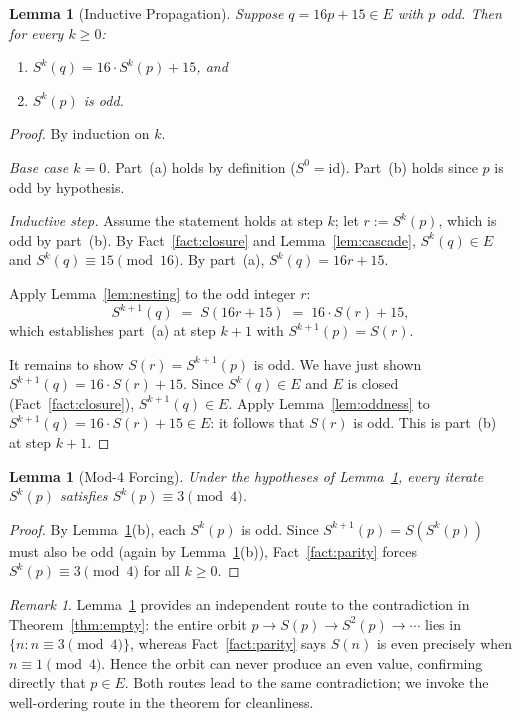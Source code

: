 \documentclass{amsart}
\newtheorem{lemma}[theorem]{Lemma}
\theoremstyle{definition}
\theoremstyle{remark}
\newtheorem{remark}[theorem]{Remark}
\begin{document}
\begin{lemma}[Inductive Propagation]
\label{lem:propagation}
Suppose $q=16p+15\in E$ with $p$ odd.
Then for every $k\ge 0$:
\begin{enumerate}[label=(\alph*)]
  \item $S^k(q) = 16\cdot S^k(p)+15$, and
  \item $S^k(p)$ is odd.
\end{enumerate}
\end{lemma}

\begin{proof}
By induction on $k$.

\medskip
\noindent\textit{Base case $k=0$.}
Part~(a) holds by definition ($S^0=\mathrm{id}$).
Part~(b) holds since $p$ is odd by hypothesis.

\medskip
\noindent\textit{Inductive step.}
Assume the statement holds at step $k$; let $r:=S^k(p)$, which is odd by
part~(b).
By Fact~\ref{fact:closure} and Lemma~\ref{lem:cascade}, $S^k(q)\in E$ and
$S^k(q)\equiv 15\pmod{16}$.
By part~(a), $S^k(q)=16r+15$.

Apply Lemma~\ref{lem:nesting} to the odd integer $r$:
\[
  S^{k+1}(q) \;=\; S(16r+15) \;=\; 16\cdot S(r)+15,
\]
which establishes part~(a) at step $k+1$ with $S^{k+1}(p)=S(r)$.

It remains to show $S(r)=S^{k+1}(p)$ is odd.
We have just shown $S^{k+1}(q)=16\cdot S(r)+15$.
Since $S^k(q)\in E$ and $E$ is closed (Fact~\ref{fact:closure}),
$S^{k+1}(q)\in E$.
Apply Lemma~\ref{lem:oddness} to $S^{k+1}(q)=16\cdot S(r)+15\in E$: it
follows that $S(r)$ is odd.
This is part~(b) at step $k+1$.
\end{proof}

\begin{lemma}[Mod-4 Forcing]
\label{lem:mod4}
Under the hypotheses of Lemma~\ref{lem:propagation}, every iterate $S^k(p)$
satisfies $S^k(p)\equiv 3\pmod{4}$.
\end{lemma}

\begin{proof}
By Lemma~\ref{lem:propagation}(b), each $S^k(p)$ is odd.
Since $S^{k+1}(p)=S(S^k(p))$ must also be odd
(again by Lemma~\ref{lem:propagation}(b)), Fact~\ref{fact:parity} forces
$S^k(p)\equiv 3\pmod{4}$ for all $k\ge 0$.
\end{proof}

\begin{remark}
Lemma~\ref{lem:mod4} provides an independent route to the contradiction in
Theorem~\ref{thm:empty}: the entire orbit $p\to S(p)\to S^2(p)\to\cdots$
lies in $\{n:n\equiv 3\pmod{4}\}$, whereas Fact~\ref{fact:parity} says
$S(n)$ is even precisely when $n\equiv 1\pmod{4}$.
Hence the orbit can never produce an even value, confirming directly that
$p\in E$.
Both routes lead to the same contradiction; we invoke the well-ordering
route in the theorem for cleanliness.
\end{remark}
\end{document}
